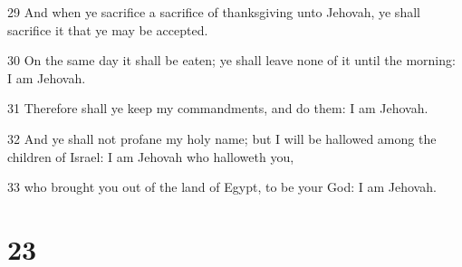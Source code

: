 \par 29 And when ye sacrifice a sacrifice of thanksgiving unto Jehovah, ye shall sacrifice it that ye may be accepted.
\par 30 On the same day it shall be eaten; ye shall leave none of it until the morning: I am Jehovah.
\par 31 Therefore shall ye keep my commandments, and do them: I am Jehovah.
\par 32 And ye shall not profane my holy name; but I will be hallowed among the children of Israel: I am Jehovah who halloweth you,
\par 33 who brought you out of the land of Egypt, to be your God: I am Jehovah.

\chapter{23}

